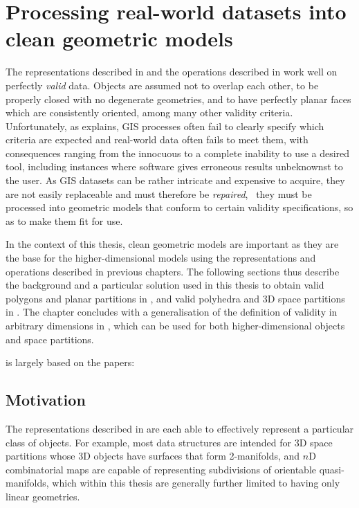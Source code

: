 
\chapter{Processing real-world datasets into clean geometric models}
\label{ch:cleaning}

The representations described in  and the operations described in  work well on perfectly \emph{valid} data.
Objects are assumed not to overlap each other, to be properly closed with no degenerate geometries, and to have perfectly planar faces which are consistently oriented, among many other validity criteria.
Unfortunately, as  explains, GIS processes often fail to clearly specify which criteria are expected and real-world data often fails to meet them, with consequences ranging from the innocuous to a complete inability to use a desired tool, including instances where software gives erroneous results unbeknownst to the user.
As GIS datasets can be rather intricate and expensive to acquire, they are not easily replaceable and must therefore be \emph{repaired}, \ie\ they must be processed into geometric models that conform to certain validity specifications, so as to make them fit for use.

In the context of this thesis, clean geometric models are important as they are the base for the higher-dimensional models using the representations and operations described in previous chapters.
The following sections thus describe the background and a particular solution used in this thesis to obtain valid polygons and planar partitions in , and valid polyhedra and 3D space partitions in .
The chapter concludes with a generalisation of the definition of validity in arbitrary dimensions in , which can be used for both higher-dimensional objects and space partitions.

 is largely based on the papers:
\begin{itemize}
\paperpfgpprepair%
\papercgeoprepair%
\end{itemize}

\section{Motivation}
\label{se:repair-motivation}

The representations described in  are each able to effectively represent a particular class of objects.
For example, most data structures are intended for 3D space partitions whose 3D objects have surfaces that form 2-manifolds, and $n$D combinatorial maps are capable of representing subdivisions of orientable quasi-manifolds, which within this thesis are generally further limited to having only linear geometries.

